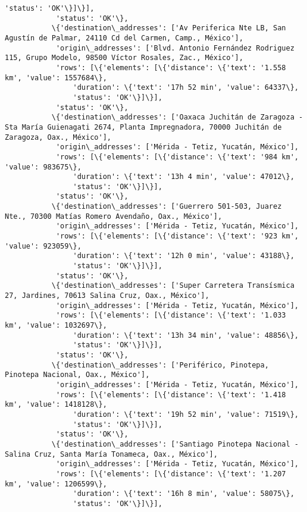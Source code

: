 \documentclass[11pt]{article}
\begin{document}
\begin{Verbatim}[commandchars=\\\{\}]
                'status': 'OK'\}]\}],
            'status': 'OK'\},
           \{'destination\_addresses': ['Av Periferica Nte LB, San Agustín de Palmar, 24110 Cd del Carmen, Camp., México'],
            'origin\_addresses': ['Blvd. Antonio Fernández Rodriguez 115, Grupo Modelo, 98500 Víctor Rosales, Zac., México'],
            'rows': [\{'elements': [\{'distance': \{'text': '1.558 km', 'value': 1557684\},
                'duration': \{'text': '17h 52 min', 'value': 64337\},
                'status': 'OK'\}]\}],
            'status': 'OK'\},
           \{'destination\_addresses': ['Oaxaca Juchitán de Zaragoza - Sta María Guienagati 2674, Planta Impregnadora, 70000 Juchitán de Zaragoza, Oax., México'],
            'origin\_addresses': ['Mérida - Tetiz, Yucatán, México'],
            'rows': [\{'elements': [\{'distance': \{'text': '984 km', 'value': 983675\},
                'duration': \{'text': '13h 4 min', 'value': 47012\},
                'status': 'OK'\}]\}],
            'status': 'OK'\},
           \{'destination\_addresses': ['Guerrero 501-503, Juarez Nte., 70300 Matías Romero Avendaño, Oax., México'],
            'origin\_addresses': ['Mérida - Tetiz, Yucatán, México'],
            'rows': [\{'elements': [\{'distance': \{'text': '923 km', 'value': 923059\},
                'duration': \{'text': '12h 0 min', 'value': 43188\},
                'status': 'OK'\}]\}],
            'status': 'OK'\},
           \{'destination\_addresses': ['Super Carretera Transísmica 27, Jardines, 70613 Salina Cruz, Oax., México'],
            'origin\_addresses': ['Mérida - Tetiz, Yucatán, México'],
            'rows': [\{'elements': [\{'distance': \{'text': '1.033 km', 'value': 1032697\},
                'duration': \{'text': '13h 34 min', 'value': 48856\},
                'status': 'OK'\}]\}],
            'status': 'OK'\},
           \{'destination\_addresses': ['Periférico, Pinotepa, Pinotepa Nacional, Oax., México'],
            'origin\_addresses': ['Mérida - Tetiz, Yucatán, México'],
            'rows': [\{'elements': [\{'distance': \{'text': '1.418 km', 'value': 1418128\},
                'duration': \{'text': '19h 52 min', 'value': 71519\},
                'status': 'OK'\}]\}],
            'status': 'OK'\},
           \{'destination\_addresses': ['Santiago Pinotepa Nacional - Salina Cruz, Santa María Tonameca, Oax., México'],
            'origin\_addresses': ['Mérida - Tetiz, Yucatán, México'],
            'rows': [\{'elements': [\{'distance': \{'text': '1.207 km', 'value': 1206599\},
                'duration': \{'text': '16h 8 min', 'value': 58075\},
                'status': 'OK'\}]\}],

\end{Verbatim}
\end{document}
